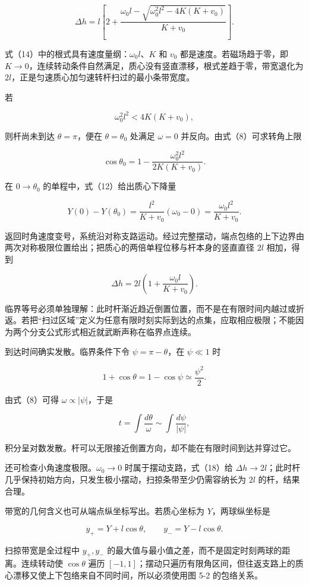 \documentclass[12pt,a4paper,UTF8]{ctexart}
\begin{document}
\[
\boxed{
\Delta h
=l\left[
2+\frac{\omega_0l-
\sqrt{\omega_0^2l^2-4K(K+v_0)}}
{K+v_0}
\right]
}.
\tag{14}
\]

式（14）中的根式具有速度量纲：\(\omega_0l\)、\(K\) 和 \(v_0\)
都是速度。若磁场趋于零，即
\(K\to0\)，连续转动条件自然满足，质心没有竖直漂移，根式差趋于零，带宽退化为
\(2l\)，正是匀速质心加匀速转杆扫过的最小条带宽度。

若

\[
\omega_0^2l^2<4K(K+v_0),
\tag{15}
\]

则杆尚未到达 \(\theta=\pi\)，便在 \(\theta=\theta_0\) 处满足
\(\omega=0\) 并反向。由式（8）可求转角上限

\[
\cos\theta_0
=1-\frac{\omega_0^2l^2}{2K(K+v_0)}.
\tag{16}
\]

在 \(0\to\theta_0\) 的单程中，式（12）给出质心下降量

\[
Y(0)-Y(\theta_0)
=\frac{l^2}{K+v_0}(\omega_0-0)
=\frac{\omega_0l^2}{K+v_0}.
\tag{17}
\]

返回时角速度变号，系统沿对称支路运动。经过完整摆动，端点包络的上下边界由两次对称极限位置给出；把质心的两倍单程位移与杆本身的竖直直径
\(2l\) 相加，得到

\[
\boxed{
\Delta h
=2l\left(1+\frac{\omega_0l}{K+v_0}\right)
}.
\tag{18}
\]

临界等号必须单独理解：此时杆渐近趋近倒置位置，而不是在有限时间内越过或折返。若把``扫过区域''定义为任意有限时刻实际到达的点集，应取相应极限；不能因为两个分支公式形式相近就武断声称在临界点连续。

到达时间确实发散。临界条件下令 \(\psi=\pi-\theta\)，在 \(\psi\ll1\) 时

\[
1+\cos\theta
=1-\cos\psi\simeq\frac{\psi^2}{2}.
\]

由式（8）可得 \(\omega\propto|\psi|\)，于是

\[
t=\int\frac{d\theta}{\omega}
\sim\int\frac{d\psi}{|\psi|},
\]

积分呈对数发散。杆可以无限接近倒置方向，却不能在有限时间到达并穿过它。

还可检查小角速度极限。\(\omega_0\to0\) 时属于摆动支路，式（18）给
\(\Delta h\to2l\)；此时杆几乎保持初始方向，只发生极小摆动，扫掠条带至少仍需容纳长为
\(2l\) 的杆，结果合理。

带宽的几何含义也可从端点纵坐标写出。若质心坐标为 \(Y\)，两球纵坐标是

\[
y_+=Y+l\cos\theta,
\qquad
y_-=Y-l\cos\theta.
\]

扫掠带宽是全过程中 \(y_+,y_-\)
的最大值与最小值之差，而不是固定时刻两球的距离。连续转动使
\(\cos\theta\) 遍历
\([-1,1]\)；摆动只遍历有限角区间，但往返支路上的质心漂移又使上下包络来自不同时间，所以必须使用图
5-2 的包络关系。
\end{document}
